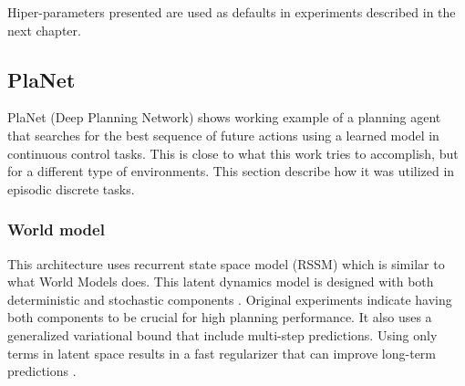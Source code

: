 Hiper-parameters presented are used as defaults in experiments described in the next chapter.

\subsection{PlaNet}

PlaNet (Deep Planning Network) \cite{Algo.PlaNet} shows working example of a planning agent that searches for the best sequence of future actions using a learned model in continuous control tasks. This is close to what this work tries to accomplish, but for a different type of environments. This section describe how it was utilized in episodic discrete tasks.

\subsubsection{World model}

This architecture uses recurrent state space model (RSSM) which is similar to what World Models does. This latent dynamics model is designed with both deterministic and stochastic components \cite{Algo.FastGenerativeModels}. Original experiments indicate having both components to be crucial for high planning performance. It also uses a generalized variational bound that include multi-step predictions. Using only terms in latent space results in a fast regularizer that can improve long-term predictions \cite{Algo.PlaNet}.

